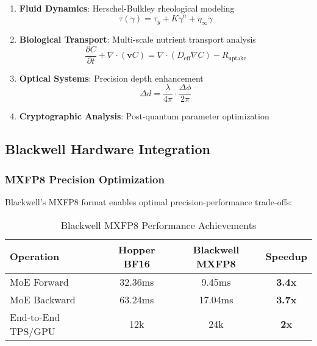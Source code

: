 \documentclass[11pt,a4paper]{article}
\newcommand{\result}[1]{\textcolor{resultcolor}{\textbf{#1}}}
\begin{document}
\begin{enumerate}
    \item \textbf{Fluid Dynamics}: Herschel-Bulkley rheological modeling
    \begin{equation}
    \tau(\dot{\gamma}) = \tau_y + K \dot{\gamma}^n + \eta_\infty \dot{\gamma}
    \end{equation}

    \item \textbf{Biological Transport}: Multi-scale nutrient transport analysis
    \begin{equation}
    \frac{\partial C}{\partial t} + \nabla \cdot (\mathbf{v}C) = \nabla \cdot (D_{\text{eff}} \nabla C) - R_{\text{uptake}}
    \end{equation}

    \item \textbf{Optical Systems}: Precision depth enhancement
    \begin{equation}
    \Delta d = \frac{\lambda}{4\pi} \cdot \frac{\Delta \phi}{2\pi}
    \end{equation}

    \item \textbf{Cryptographic Analysis}: Post-quantum parameter optimization
\end{enumerate}

\subsection{Blackwell Hardware Integration}

\subsubsection{MXFP8 Precision Optimization}
Blackwell's MXFP8 format enables optimal precision-performance trade-offs:

\begin{table}[H]
\centering
\caption{Blackwell MXFP8 Performance Achievements}
\label{tab:blackwell_performance}
\begin{tabular}{@{}lccc@{}}
\toprule
Operation & Hopper BF16 & Blackwell MXFP8 & Speedup \\
\midrule
MoE Forward & 32.36ms & 9.45ms & \result{3.4x} \\
MoE Backward & 63.24ms & 17.04ms & \result{3.7x} \\
End-to-End TPS/GPU & 12k & 24k & \result{2x} \\
\bottomrule
\end{tabular}
\end{table}
\end{document}
